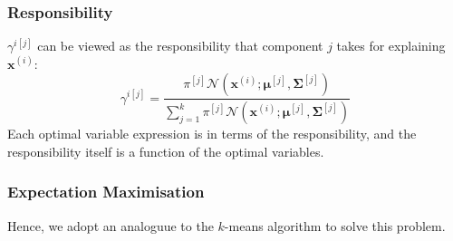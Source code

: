 \subsubsection{Responsibility}
$\gamma^{i[j]}$ can be viewed as the responsibility that component $j$ takes
for explaining $\mathbf{x}^{(i)}$:
\[\gamma^{i[j]}=\frac{\pi^{[j]}\mathcal{N}\left(\mathbf{x}^{(i)};\mathbf{\mu}^{[j]},\mathbf{\Sigma}^{[j]}\right)}{\sum_{j=1}^{k}
\pi^{[j]}\mathcal{N}\left(\mathbf{x}^{(i)};\mathbf{\mu}^{[j]},\mathbf{\Sigma}^{[j]}\right)}\]
Each optimal variable expression is in terms of the responsibility, and the
responsibility itself is a function of the optimal variables. 
\subsubsection{Expectation Maximisation}
Hence, we adopt an analoguue to the $k$-means algorithm to solve this problem.
